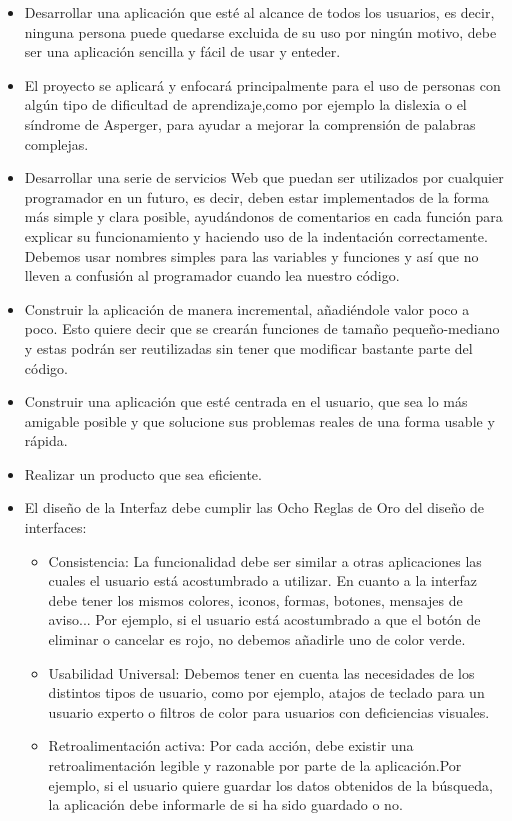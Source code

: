 \begin{itemize}
	\item Desarrollar una aplicación que esté al alcance de todos los usuarios, es decir, ninguna persona puede quedarse excluida de su uso por ningún motivo, debe ser una aplicación sencilla y fácil de usar y enteder.
	\item El proyecto se aplicará y enfocará principalmente para el uso de personas con algún tipo de dificultad de aprendizaje,como por ejemplo la dislexia o el síndrome de Asperger, para ayudar a mejorar la comprensión de palabras complejas.
	\item Desarrollar una serie de servicios Web que puedan ser utilizados por cualquier programador en un futuro, es decir, deben estar implementados de la forma más simple y clara posible, ayudándonos de comentarios en cada función para explicar su funcionamiento y haciendo uso de la indentación correctamente. Debemos usar nombres simples para las variables y funciones y así que no lleven a confusión al programador cuando lea nuestro código.
	\item Construir la aplicación de manera incremental, añadiéndole valor poco a poco. Esto quiere decir que se crearán funciones de tamaño pequeño-mediano y estas podrán ser reutilizadas sin tener que modificar bastante parte del código.
	\item Construir una aplicación que esté centrada en el usuario, que sea lo más amigable posible y que solucione sus problemas reales de una forma usable y rápida.
	\item Realizar un producto que sea eficiente.
	\item El diseño de la Interfaz debe cumplir las Ocho Reglas de Oro del diseño de interfaces:
	\begin{itemize} 
		\item Consistencia: La funcionalidad debe ser similar a otras aplicaciones las cuales el usuario está acostumbrado a utilizar. En cuanto a la interfaz debe tener los mismos colores, iconos, formas, botones, mensajes de aviso... Por ejemplo, si el usuario está acostumbrado a que el botón de eliminar o cancelar es rojo, no debemos añadirle uno de color verde. 
		\item Usabilidad Universal: Debemos tener en cuenta las necesidades de los distintos tipos de usuario, como por ejemplo, atajos de teclado para un usuario experto o filtros de color para usuarios con deficiencias visuales.
		\item Retroalimentación activa: Por cada acción, debe existir una retroalimentación legible y razonable por parte de la aplicación.Por ejemplo, si el usuario quiere guardar los datos obtenidos de la búsqueda, la aplicación debe informarle de si ha sido guardado o no.

\end{itemize}
\end{itemize}
